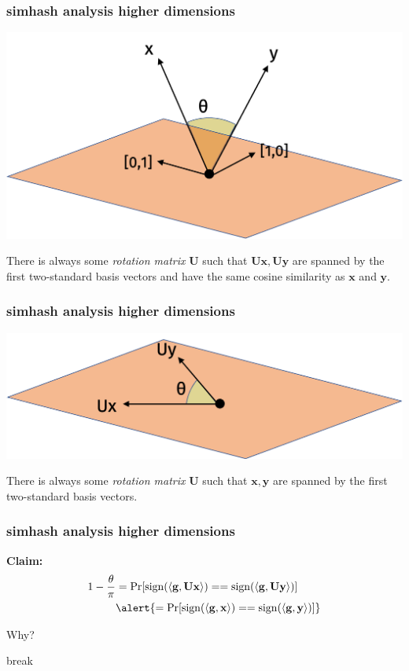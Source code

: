 \documentclass[compress]{beamer}
\newcommand{\bv}[1]{\mathbf{#1}}
\DeclareMathOperator{\sign}{sign}
\begin{document}
\begin{frame}
	\frametitle{simhash analysis higher dimensions}
	\begin{center}
		\includegraphics[width=.7\textwidth]{high_dim1.png}
	\end{center}
There is always some \emph{rotation matrix} $\bv{U}$ such that $\bv{U}\bv{x},\bv{U}\bv{y}$ are spanned by the first two-standard basis vectors and have the same cosine similarity as $\bv{x}$ and $\bv{y}$.
\end{frame}

\begin{frame}
	\frametitle{simhash analysis higher dimensions}
	\begin{center}
		\includegraphics[width=.7\textwidth]{high_dim2.png}
	\end{center}
	There is always some \emph{rotation matrix} $\bv{U}$ such that $\bv{x},\bv{y}$ are spanned by the first two-standard basis vectors. 
\end{frame}

\begin{frame}[t]
	\frametitle{simhash analysis higher dimensions}
\textbf{Claim:} 
\begin{align*}
1 - \frac{\theta}{\pi} &= \Pr[\sign(\langle \bv{g}, \bv{U}\bv{x} \rangle) == \sign(\langle \bv{g}, \bv{U}\bv{y} \rangle)] \\
&\alert{= \Pr[\sign(\langle \bv{g}, \bv{x} \rangle) == \sign(\langle \bv{g}, \bv{y} \rangle)]}
\end{align*}

	Why?
\end{frame}

\begin{frame}[standout]
	\begin{center}
		break
	\end{center}
\end{frame}
\end{document}
